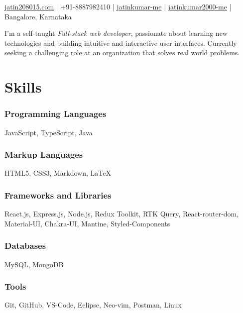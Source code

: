 \documentclass[a4paper]{article}
\author{Jatin Kumar}
\begin{document}
\begin{center}
	\makeatletter
	\centering {\huge \@author}
	\makeatother
    \vspace{6pt}

    \href{mailto:jatin208015\@gmail.com}{{\faAt} jatin208015\@gmail.com} | 
    {\faPhone } +91-8887982410 | 
    \href{https://github.com/jatinkumar-me}{{\faGithub} jatinkumar-me} |
    \href{https://www.linkedin.com/in/jatinkumar-2000-me/}{{\faLinkedin} {jatinkumar2000-me}} |
    {\faMapMarker} Bangalore, Karnataka
\end{center}

\begin{flushleft}
    I’m a self-taught \textit{Full-stack web developer}, passionate about learning new technologies and building intuitive and interactive user interfaces. Currently seeking a challenging role at an organization that solves real world problems.
\end{flushleft}

\section{Skills}
\subsubsection*{Programming Languages}
    JavaScript, TypeScript, Java
    \vspace{-10pt}
\subsubsection*{Markup Languages}
    HTML5, CSS3, Markdown, \LaTeX
    \vspace{-10pt}
\subsubsection*{Frameworks and Libraries}
React.js, Express.js, Node.js, Redux Toolkit, RTK Query, React-router-dom, Material-UI, Chakra-UI, Mantine, Styled-Components
    \vspace{-10pt}
\subsubsection*{Databases}
MySQL, MongoDB 
    \vspace{-10pt}
\subsubsection*{Tools}
Git, GitHub, VS-Code, Eclipse, Neo-vim, Postman, Linux
\end{document}
